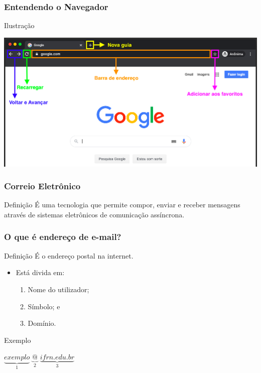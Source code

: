 \documentclass[aspectratio=169]{beamer} %
\begin{document}
\begin{frame}
	\frametitle{Entendendo o Navegador}

	\begin{exampleblock}{Ilustra\c cão}
		\begin{center}
			\includegraphics[scale=0.35]{img/navegador}
		\end{center}
	\end{exampleblock}	
\end{frame}

\begin{frame}
	\frametitle{Correio Eletrônico}

	\begin{block}{Defini\c cão}
		É uma tecnologia que permite compor, enviar e receber mensagens através de sistemas eletrônicos de comunicação assíncrona.
	\end{block}
\end{frame}

\begin{frame}
	\frametitle{O que é endere\c co de e-mail?}

	\begin{block}{Defini\c cão}
		É o endere\c co postal na internet.
	\end{block} \vfill
	
	\begin{itemize}
		\item Está divida em: 
			\begin{enumerate}
				\item Nome do utilizador; 
				\item Símbolo;  e
				\item Domínio. 
			\end{enumerate}				
	\end{itemize} \vfill
	
	\begin{exampleblock}{Exemplo}
		\begin{center}
			$\underbrace{exemplo}_{1}$ $\underbrace{@}_{2}$ $\underbrace{ifrn.edu.br}_{3}$
		\end{center}
	\end{exampleblock}
\end{frame}
\end{document}
